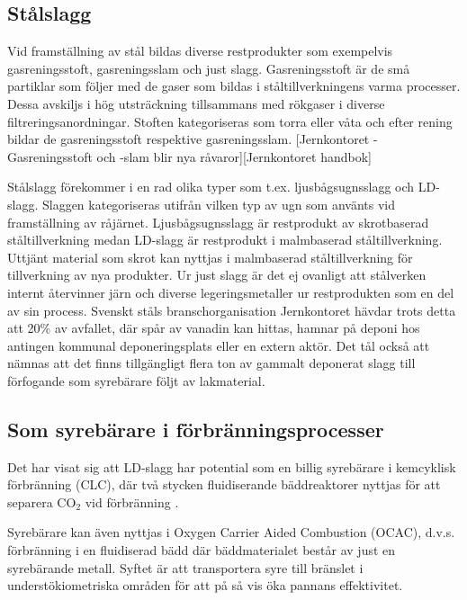 \documentclass{article}
\begin{document}
\subsection{Stålslagg}
Vid framställning av stål bildas diverse restprodukter som exempelvis gasreningsstoft, gasreningsslam och just slagg. Gasreningsstoft är de små partiklar som följer med de gaser som bildas i ståltillverkningens varma processer. Dessa avskiljs i hög utsträckning tillsammans med rökgaser i diverse filtreringsanordningar. Stoften kategoriseras som torra eller våta och efter rening  bildar de gasreningsstoft respektive gasreningsslam. [Jernkontoret - Gasreningsstoft och -slam blir nya råvaror][Jernkontoret handbok] 

Stålslagg förekommer i en rad olika typer som t.ex. ljusbågsugnsslagg och LD-slagg\cite{Pehlke2014a}. 
Slaggen kategoriseras utifrån vilken typ av ugn som använts vid framställning av råjärnet. Ljusbågsugnsslagg är restprodukt av skrotbaserad ståltillverkning medan LD-slagg är restprodukt i malmbaserad ståltillverkning\cite{Pehlke2014a}.
Uttjänt material som skrot kan nyttjas i malmbaserad ståltillverkning för tillverkning av nya produkter.
Ur just slagg är det ej ovanligt att stålverken internt återvinner järn och diverse legeringsmetaller ur restprodukten som en del av sin process.  Svenskt ståls branschorganisation Jernkontoret hävdar trots detta att 20\% av avfallet, där spår av vanadin kan hittas, hamnar på deponi hos antingen kommunal deponeringsplats eller en extern aktör\cite{PontusWestrin}. Det tål också att nämnas att det finns tillgängligt flera ton av gammalt deponerat slagg till förfogande som syrebärare följt av lakmaterial.


\subsection{Som syrebärare i förbränningsprocesser}
Det har visat sig att LD-slagg har potential som en billig syrebärare i kemcyklisk förbränning (CLC), där två stycken fluidiserande bäddreaktorer nyttjas för att separera CO$_2$ vid förbränning \cite{Xu2017}.
 
Syrebärare kan även nyttjas i Oxygen Carrier Aided Combustion (OCAC), d.v.s. förbränning i en fluidiserad bädd där bäddmaterialet består av just en syrebärande metall.
Syftet är att transportera syre till bränslet i understökiometriska områden för att på så vis öka pannans effektivitet\cite{Zevenhoven2018}.
 
\end{document}
